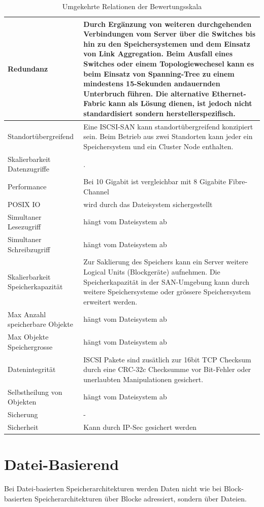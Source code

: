 \begin{table}[htbp]
\caption{Umgekehrte Relationen der Bewertungsskala}
\begin{tabular}{|L{3.5cm}|L{10cm}|}
\hline
Redundanz & Durch Ergänzung von weiteren durchgehenden Verbindungen vom Server über die Switches bis hin zu den Speichersystemen und dem Einsatz von Link Aggregation. Beim Ausfall eines Switches oder einem Topologiewechesel kann es beim Einsatz von Spanning-Tree zu einem mindestens 15-Sekunden andauernden Unterbruch führen. Die alternative Ethernet-Fabric kann als Lösung dienen, ist jedoch nicht standardisiert sondern herstellerspezifisch. \\ \hline
Standortübergreifend & Eine ISCSI-SAN kann standortübergreifend konzipiert sein. Beim Betrieb aus zwei Standorten kann jeder ein Speichersystem und ein Cluster Node enthalten. \\ \hline
Skalierbarkeit Datenzugriffe & . \\ \hline
Performance & Bei 10 Gigabit ist vergleichbar mit 8 Gigabite Fibre-Channel \\ \hline
POSIX IO & wird durch das Dateisystem sichergestellt \\ \hline
Simultaner Lesezugriff & hängt vom Dateisystem ab \\ \hline
Simultaner Schreibzugriff & hängt vom Dateisystem ab \\ \hline
Skalierbarkeit Speicherkapazität & Zur Saklierung des Speichers kann ein Server weitere Logical Units (Blockgeräte) aufnehmen. Die Speicherkapazität in der SAN-Umgebung kann durch weitere Speichersysteme oder grössere Speichersystem erweitert werden. \\ \hline
Max Anzahl speicherbare Objekte & hängt vom Dateisystem ab \\ \hline
Max Objekte Speichergrosse & hängt vom Dateisystem ab \\ \hline
Datenintegrität & ISCSI Pakete sind zusätlich zur 16bit TCP Checksum durch eine CRC-32c Checksumme vor Bit-Fehler oder unerlaubten Manipulationen gesichert. \\ \hline
Selbstheilung von Objekten & hängt vom Dateisystem ab \\ \hline
Sicherung & - \\ \hline
Sicherheit & Kann durch IP-Sec gesichert werden \\ \hline
\end{tabular}
\label{UmgekehrteBewertungsskala}
\end{table}


\section{Datei-Basierend}
Bei Datei-basierten Speicherarchitekturen werden Daten nicht wie bei Block-basierten Speicherarchitekturen über Blocke adressiert, sondern über Dateien.

